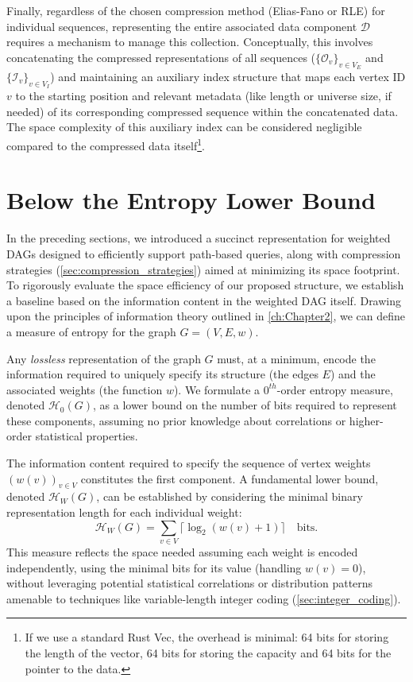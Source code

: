 Finally, regardless of the chosen compression method (Elias-Fano or RLE) for individual sequences, representing the entire associated data component $\mathcal{D}$ requires a mechanism to manage this collection. Conceptually, this involves concatenating the compressed representations of all sequences ($\{\mathcal{O}_v\}_{v \in V_E}$ and $\{\mathcal{I}_v\}_{v \in V_I}$) and maintaining an auxiliary index structure that maps each vertex ID $v$ to the starting position and relevant metadata (like length or universe size, if needed) of its corresponding compressed sequence within the concatenated data. The space complexity of this auxiliary index can be considered negligible compared to the compressed data itself\footnote{If we use a standard Rust \textsf{Vec}, the overhead is minimal: 64 bits for storing the length of the vector, 64 bits for storing the capacity and 64 bits for the pointer to the data.}.

\clearpage
\section{Below the Entropy Lower Bound}
\label{sec:below_entropy}

In the preceding sections, we introduced a succinct representation for weighted DAGs designed to efficiently support path-based queries, along with compression strategies (\autoref{sec:compression_strategies}) aimed at minimizing its space footprint. To rigorously evaluate the space efficiency of our proposed structure, we establish a baseline based on the information content in the weighted DAG itself. Drawing upon the principles of information theory outlined in \autoref{ch:Chapter2}, we can define a measure of entropy for the graph $G=(V, E, w)$.

Any \emph{lossless} representation of the graph $G$ must, at a minimum, encode the information required to uniquely specify its structure (the edges $E$) and the associated weights (the function $w$). We formulate a $0^{th}$-order entropy measure, denoted $\mathcal{H}_0(G)$, as a lower bound on the number of bits required to represent these components, assuming no prior knowledge about correlations or higher-order statistical properties.

The information content required to specify the sequence of vertex weights $(w(v))_{v \in V}$ constitutes the first component. A fundamental lower bound, denoted $\mathcal{H}_W(G)$, can be established by considering the minimal binary representation length for each individual weight:
\[ \mathcal{H}_W(G) = \sum_{v \in V} \lceil \log_2 (w(v)+1) \rceil \quad \text{bits}. \]
This measure reflects the space needed assuming each weight is encoded independently, using the minimal bits for its value (handling $w(v)=0$), without leveraging potential statistical correlations or distribution patterns amenable to techniques like variable-length integer coding (\autoref{sec:integer_coding}).

